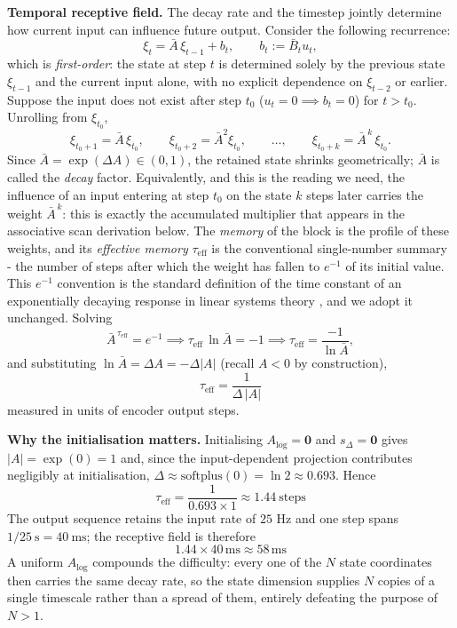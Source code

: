 \documentclass[11pt,a4paper]{article}
\begin{document}
\begin{enumerate}
		\textbf{Temporal receptive field.} The decay rate and the timestep jointly determine how current input can influence future output. Consider the following recurrence: $$\xi_t = \bar{A}\,\xi_{t-1} + b_t, \qquad b_t := \bar{B}_t u_t,$$ which is \emph{first-order}: the state at step $t$ is determined solely by the previous state $\xi_{t-1}$ and the current input alone, with no explicit dependence on $\xi_{t-2}$ or earlier. Suppose the input does not exist after step $t_0$ ($u_t = 0 \implies b_t = 0$) for $t > t_0$. Unrolling from $\xi_{t_0}$,
		$$\xi_{t_0+1} = \bar{A} \, \xi_{t_0}, \qquad \xi_{t_0+2} = \bar{A}^2 \xi_{t_0}, \qquad \dots, \qquad \xi_{t_0+k} = \bar{A}^{\,k}\,\xi_{t_0}.$$
		Since $\bar{A} = \exp(\Delta A) \in (0,1)$, the retained state shrinks geometrically; $\bar{A}$ is called the \emph{decay} factor. Equivalently, and this is the reading we need, the influence of an input entering at step $t_0$ on the state $k$ steps later carries the weight $\bar{A}^{\,k}$: this is exactly the accumulated multiplier that appears in the associative scan derivation below. The \emph{memory} of the block is the profile of these weights, and its \emph{effective memory} $\tau_{\text{eff}}$ is the conventional single-number summary - the number of steps after which the weight has fallen to $e^{-1}$ of its initial value. This $e^{-1}$ convention is the standard definition of the time constant of an exponentially decaying response in linear systems theory \cite{oppenheim1997}, and we adopt it unchanged. Solving $$ \bar{A}^{\,\tau_{\text{eff}}} = e^{-1} \implies \tau_{\text{eff}}\,\ln \bar{A} = -1 \implies \tau_{\text{eff}} = \frac{-1}{\ln \bar{A}},$$ and substituting $\ln\bar{A} = \Delta A = -\Delta|A|$ (recall $A<0$ by construction), $$\boxed{\ \tau_{\text{eff}} = \frac{1}{\Delta\,|A|}\ } $$ measured in units of encoder output steps.

		\textbf{Why the initialisation matters.} Initialising $A_{\log} = \mathbf{0}$ and $s_\Delta = \mathbf{0}$ gives $|A| = \exp(0) = 1$ and, since the input-dependent projection contributes negligibly at initialisation, $\Delta \approx \text{softplus}(0) = \ln 2 \approx 0.693$. Hence $$\tau_{\text{eff}} = \frac{1}{0.693 \times 1} \approx 1.44 \ \text{steps}$$ The output sequence retains the input rate of $25$ Hz and one step spans $1/25 \ \text{s} = 40 \ \text{ms}$; the receptive field is therefore $$1.44 \times 40\,\text{ms} \approx 58\,\text{ms}$$ A uniform $A_{\log}$ compounds the difficulty: every one of the $N$ state coordinates then carries the same decay rate, so the state dimension supplies $N$ copies of a single timescale rather than a spread of them, entirely defeating the purpose of $N > 1$.


\end{enumerate}
\end{document}
